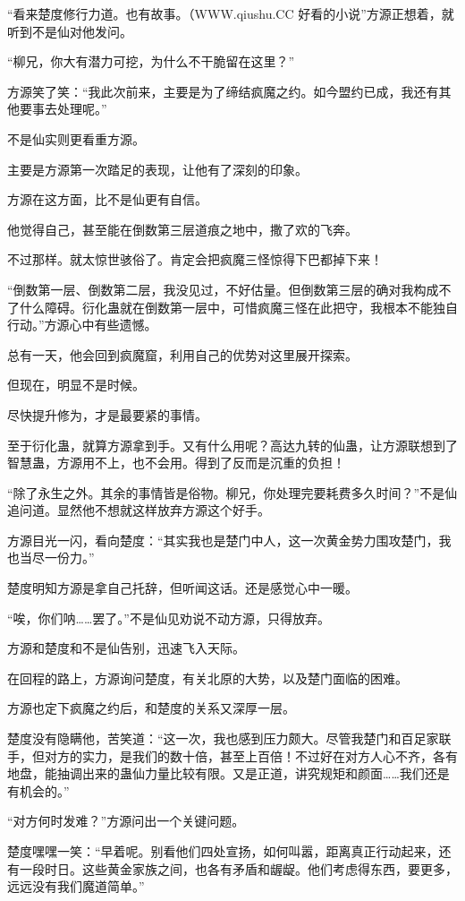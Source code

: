 \begin{this_body}
“看来楚度修行力道。也有故事。（WWW.qiushu.CC 好看的小说”方源正想着，就听到不是仙对他发问。

“柳兄，你大有潜力可挖，为什么不干脆留在这里？”

方源笑了笑：“我此次前来，主要是为了缔结疯魔之约。如今盟约已成，我还有其他要事去处理呢。”

不是仙实则更看重方源。

主要是方源第一次踏足的表现，让他有了深刻的印象。

方源在这方面，比不是仙更有自信。

他觉得自己，甚至能在倒数第三层道痕之地中，撒了欢的飞奔。

不过那样。就太惊世骇俗了。肯定会把疯魔三怪惊得下巴都掉下来！

“倒数第一层、倒数第二层，我没见过，不好估量。但倒数第三层的确对我构成不了什么障碍。衍化蛊就在倒数第一层中，可惜疯魔三怪在此把守，我根本不能独自行动。”方源心中有些遗憾。

总有一天，他会回到疯魔窟，利用自己的优势对这里展开探索。

但现在，明显不是时候。

尽快提升修为，才是最要紧的事情。

至于衍化蛊，就算方源拿到手。又有什么用呢？高达九转的仙蛊，让方源联想到了智慧蛊，方源用不上，也不会用。得到了反而是沉重的负担！

“除了永生之外。其余的事情皆是俗物。柳兄，你处理完要耗费多久时间？”不是仙追问道。显然他不想就这样放弃方源这个好手。

方源目光一闪，看向楚度：“其实我也是楚门中人，这一次黄金势力围攻楚门，我也当尽一份力。”

楚度明知方源是拿自己托辞，但听闻这话。还是感觉心中一暖。

“唉，你们呐……罢了。”不是仙见劝说不动方源，只得放弃。

方源和楚度和不是仙告别，迅速飞入天际。

在回程的路上，方源询问楚度，有关北原的大势，以及楚门面临的困难。

方源也定下疯魔之约后，和楚度的关系又深厚一层。

楚度没有隐瞒他，苦笑道：“这一次，我也感到压力颇大。尽管我楚门和百足家联手，但对方的实力，是我们的数十倍，甚至上百倍！不过好在对方人心不齐，各有地盘，能抽调出来的蛊仙力量比较有限。又是正道，讲究规矩和颜面……我们还是有机会的。”

“对方何时发难？”方源问出一个关键问题。

楚度嘿嘿一笑：“早着呢。别看他们四处宣扬，如何叫嚣，距离真正行动起来，还有一段时日。这些黄金家族之间，也各有矛盾和龌龊。他们考虑得东西，要更多，远远没有我们魔道简单。”


\end{this_body}
